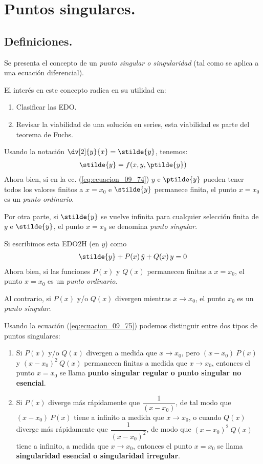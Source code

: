 \section{Puntos singulares.}
\subsection{Definiciones.}

Se presenta el concepto de un \emph{punto singular o singularidad} (tal como se aplica a una ecuación diferencial).
\par
El interés en este concepto radica en su utilidad en:
\begin{enumerate}
\item Clasificar las EDO.
\item Revisar la viabilidad de una solución en series, esta viabilidad es parte del teorema de Fuchs.
\end{enumerate}
Usando la notación $\displaystyle \dv[2]{y}{x} = \stilde{y}$, tenemos:
\begin{align}
\stilde{y} = f(x, y, \ptilde{y})
\label{eq:ecuacion_09_74}
\end{align}
Ahora bien, si en la ec. (\ref{eq:ecuacion_09_74}) $y$ e $\ptilde{y}$ pueden tener todos los valores finitos a $x = x_{0}$ e $\stilde{y}$ permanece finita, el punto $x = x_{0}$ es un \emph{punto ordinario}.
\par
Por otra parte, si $\stilde{y}$ se vuelve infinita para cualquier selección finita de $y$ e  $\stilde{y}$, el punto $x = x_{0}$ se denomina \emph{punto singular}.
\par
Si escribimos esta EDO2H (en $y$) como
\begin{align}
\stilde{y} + P(x) \, \tilde{y} + Q(x) \, y = 0
\label{eq:ecuacion_09_75}
\end{align}
Ahora bien, si las funciones $P(x)$ y $Q(x)$ permanecen finitas a $x = x_{0}$, el punto $x = x_{0}$ es un \emph{punto ordinario}.
\par
Al contrario, si $P(x)$ y/o $Q(x)$ divergen mientras $x \to x_{0}$, el punto $x_{0}$ es un \emph{punto singular}.
\par
Usando la ecuación (\ref{eq:ecuacion_09_75}) podemos distinguir entre dos tipos de puntos singulares:
\begin{enumerate}
\item Si $P(x)$ y/o $Q(x)$ divergen a medida que $x \to x_{0}$, pero $(x - x_{0}) \: P(x)$ y $(x - x_{0})^{2} \: Q(x)$ permanecen finitas a medida que $x \to x_{0}$, entonces el punto $x = x_{0}$ se llama \textbf{punto singular regular o punto singular no esencial}.
\item Si $P(x)$ diverge más rápidamente que $\dfrac{1}{(x - x_{0})}$, de tal modo que $(x - x_{0}) \: P(x)$ tiene a infinito a medida que $x \to x_{0}$, o cuando $Q(x)$ diverge más rápidamente que $\dfrac{1}{(x - x_{0})^{2}}$, de modo que $(x - x_{0})^{2} \: Q(x)$ tiene a infinito, a medida que $x \to x_{0}$, entonces el punto $x = x_{0}$ se llama \textbf{singularidad esencial o singularidad irregular}.
\end{enumerate}
